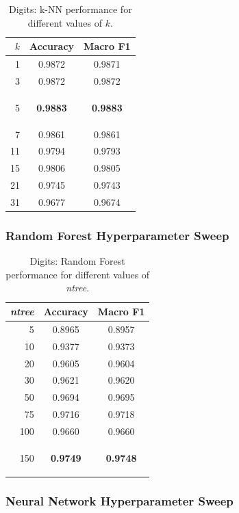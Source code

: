\documentclass[11pt]{article}
\newcommand{\best}[1]{\colorbox{bestgray}{\strut\textbf{#1}}}
\begin{document}
\begin{table}[H]
\centering
\caption{Digits: k-NN performance for different values of $k$.}
\begin{tabular}{rcc}
\toprule
$k$ & Accuracy & Macro F1 \\
\midrule
1  & 0.9872 & 0.9871 \\
3  & 0.9872 & 0.9872 \\
5  & \best{0.9883} & \best{0.9883} \\
7  & 0.9861 & 0.9861 \\
11 & 0.9794 & 0.9793 \\
15 & 0.9806 & 0.9805 \\
21 & 0.9745 & 0.9743 \\
31 & 0.9677 & 0.9674 \\
\bottomrule
\end{tabular}
\end{table}

\subsubsection*{Random Forest Hyperparameter Sweep}

\begin{table}[H]
\centering
\caption{Digits: Random Forest performance for different values of \textit{ntree}.}
\begin{tabular}{rcc}
\toprule
\textit{ntree} & Accuracy & Macro F1 \\
\midrule
5   & 0.8965 & 0.8957 \\
10  & 0.9377 & 0.9373 \\
20  & 0.9605 & 0.9604 \\
30  & 0.9621 & 0.9620 \\
50  & 0.9694 & 0.9695 \\
75  & 0.9716 & 0.9718 \\
100 & 0.9660 & 0.9660 \\
150 & \best{0.9749} & \best{0.9748} \\
\bottomrule
\end{tabular}
\end{table}

\subsubsection*{Neural Network Hyperparameter Sweep}
\end{document}
